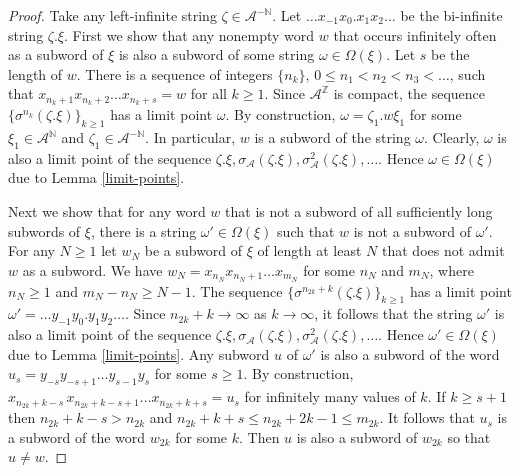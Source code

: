 \documentclass[12pt]{article}
\theoremstyle{definition}
\def\bN{\mathbb{N}}
\def\bZ{\mathbb{Z}}
\def\cA{\mathcal{A}}
\def\om{\omega}
\def\si{\sigma}
\def\Om{\Omega}
\begin{document}
\begin{proof}
Take any left-infinite string $\zeta\in\cA^{-\bN}$.  Let $\ldots 
x_{-1}x_0.x_1x_2\ldots$ be the bi-infinite string $\zeta.\xi$.  First we 
show that any nonempty word $w$ that occurs infinitely often as a subword 
of $\xi$ is also a subword of some string $\om\in\Om(\xi)$.  Let $s$ be the 
length of $w$.  There is a sequence of integers $\{n_k\}$, $0\le 
n_1<n_2<n_3<\ldots$, such that $x_{n_k+1}x_{n_k+2}\ldots x_{n_k+s}=w$ for 
all $k\ge1$.  Since $\cA^{\bZ}$ is compact, the sequence 
$\{\si^{n_k}(\zeta.\xi)\}_{k\ge1}$ has a limit point $\om$.  By 
construction, $\om=\zeta_1.w\xi_1$ for some $\xi_1\in\cA^{\bN}$ and 
$\zeta_1\in\cA^{-\bN}$.  In particular, $w$ is a subword of the string 
$\om$.  Clearly, $\om$ is also a limit point of the sequence 
$\zeta.\xi,\si_{\cA}(\zeta.\xi),\si_{\cA}^2(\zeta.\xi),\dots$.  Hence 
$\om\in\Om(\xi)$ due to Lemma \ref{limit-points}.

Next we show that for any word $w$ that is not a subword of all 
sufficiently long subwords of $\xi$, there is a string $\om'\in\Om(\xi)$ 
such that $w$ is not a subword of $\om'$.  For any $N\ge1$ let $w_N$ be a 
subword of $\xi$ of length at least $N$ that does not admit $w$ as a 
subword.  We have $w_N=x_{n_N}x_{n_N+1}\ldots x_{m_N}$ for some $n_N$ and 
$m_N$, where $n_N\ge1$ and $m_N-n_N\ge N-1$.  The sequence 
$\{\si^{n_{2k}+k}(\zeta.\xi)\}_{k\ge1}$ has a limit point $\om'=\ldots 
y_{-1}y_0.y_1y_2\ldots$.  Since $n_{2k}+k\to\infty$ as $k\to\infty$, it 
follows that the string $\om'$ is also a limit point of the sequence 
$\zeta.\xi,\si_{\cA}(\zeta.\xi),\si_{\cA}^2(\zeta.\xi),\dots$.  Hence 
$\om'\in\Om(\xi)$ due to Lemma \ref{limit-points}.  Any subword $u$ of 
$\om'$ is also a subword of the word $u_s=y_{-s}y_{-s+1}\ldots y_{s-1}y_s$ 
for some $s\ge1$.  By construction, $x_{n_{2k}+k-s}\,x_{n_{2k}+k-s+1}\ldots 
x_{n_{2k}+k+s}=u_s$ for infinitely many values of $k$.  If $k\ge s+1$ then 
$n_{2k}+k-s>n_{2k}$ and $n_{2k}+k+s\le n_{2k}+2k-1\le m_{2k}$.  It follows 
that $u_s$ is a subword of the word $w_{2k}$ for some $k$.  Then $u$ is 
also a subword of $w_{2k}$ so that $u\ne w$.


\end{proof}
\end{document}
